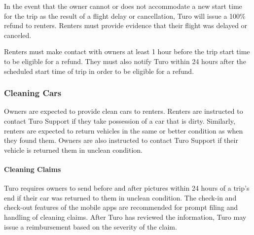\documentclass[review,12pt]{elsarticle}
\begin{document}
    In the event that the owner cannot or does not accommodate a new start time for the trip as the result of a flight delay or cancellation, Turo will issue a 100\% refund to renters. Renters must provide evidence that their flight was delayed or canceled.

    Renters must make contact with owners at least 1 hour before the trip start time to be eligible for a refund. They must also notify Turo within 24 hours after the scheduled start time of trip in order to be eligible for a refund.

  \subsubsection{Cleaning Cars}
  Owners are expected to provide clean cars to renters. Renters are instructed to contact Turo Support if they take possession of a car that is dirty. Similarly, renters are expected to return vehicles in the same or better condition as when they found them. Owners are also instructed to contact Turo Support if their vehicle is returned them in unclean condition.

    \paragraph{Cleaning Claims}
    Turo requires owners to send before and after pictures within 24 hours of a trip's end if their car was returned to them in unclean condition. The check-in and check-out features of the mobile apps are recommended for prompt filing and handling of cleaning claims. After Turo has reviewed the information, Turo may issue a reimbursement based on the severity of the claim.
\end{document}
